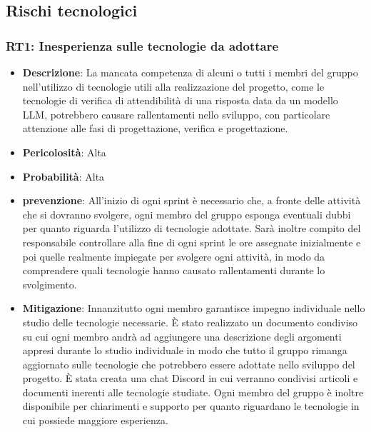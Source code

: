 \documentclass[a4paper, 12pt]{article}
\begin{document}
\subsection{Rischi tecnologici}
\subsubsection{RT1: Inesperienza sulle tecnologie da adottare}
\begin{itemize}
    \item \textbf{Descrizione}: La mancata competenza di alcuni o tutti i membri del gruppo nell'utilizzo di tecnologie utili alla realizzazione del progetto,
    come le tecnologie di verifica di attendibilità di una risposta data da un modello LLM, potrebbero causare rallentamenti nello sviluppo, con particolare
    attenzione alle fasi di progettazione, verifica e progettazione. 
    \item \textbf{Pericolosità}: Alta
    \item \textbf{Probabilità}: Alta
    \item \textbf{prevenzione}: All'inizio di ogni sprint è necessario che, a fronte delle attività che si dovranno svolgere, ogni membro 
    del gruppo esponga eventuali dubbi per quanto riguarda l'utilizzo di tecnologie adottate. Sarà inoltre compito del responsabile controllare
    alla fine di ogni sprint le ore assegnate inizialmente e poi quelle realmente impiegate per svolgere ogni attività, in modo da comprendere
    quali tecnologie hanno causato rallentamenti durante lo svolgimento.
    \item \textbf{Mitigazione}:  Innanzitutto ogni membro garantisce impegno individuale nello studio delle tecnologie necessarie.
    È stato realizzato un documento condiviso su cui ogni membro andrà ad aggiungere una descrizione degli argomenti appresi durante lo studio 
    individuale in modo che tutto il gruppo rimanga aggiornato sulle tecnologie che potrebbero essere adottate nello sviluppo del progetto.
    È stata creata una chat Discord in cui verranno condivisi articoli e documenti inerenti alle tecnologie studiate.
    Ogni membro del gruppo è inoltre disponibile per chiarimenti e supporto per quanto riguardano le tecnologie in cui possiede maggiore esperienza.
\end{itemize}
\end{document}

